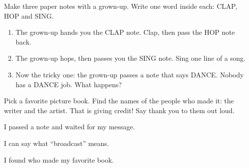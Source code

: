 
\begin{playathome}
Make three paper notes with a grown-up. Write one word inside each: CLAP, HOP and SING.
\begin{enumerate}[leftmargin=1.4em,itemsep=2pt]
  \item The grown-up hands you the CLAP note. Clap, then pass the HOP note back.
  \item The grown-up hops, then passes you the SING note. Sing one line of a song.
  \item Now the tricky one: the grown-up passes a note that says DANCE. Nobody has a DANCE job. What happens?
\end{enumerate}
\end{playathome}

\begin{playathome}
Pick a favorite picture book. Find the names of the people who made it: the writer and the artist. That is giving credit! Say thank you to them out loud.
\end{playathome}

\begin{selfcheck}
  \item I passed a note and waited for my message.
  \item I can say what \enquote{broadcast} means.
  \item I found who made my favorite book.
\end{selfcheck}
